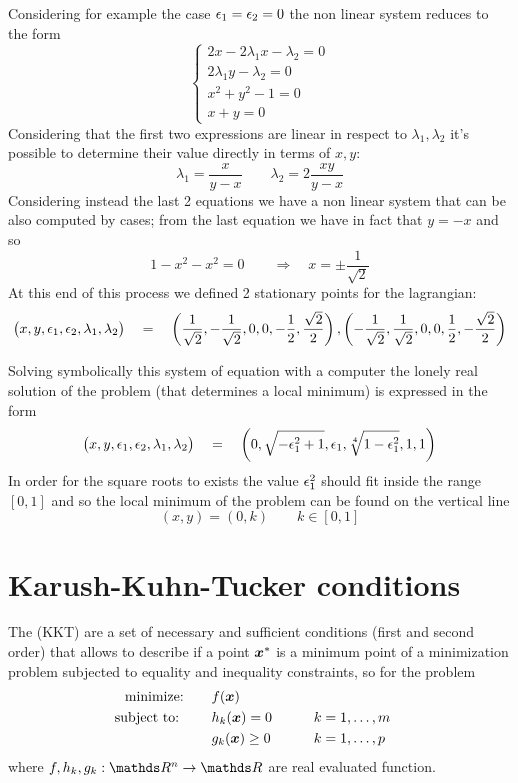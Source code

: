 \begin{example}{}
		Considering for example the case $\epsilon_{1} = \epsilon_{2} = 0$ the non linear system reduces to the form
		\[\begin{cases}
			2x - 2\lambda_1 x - \lambda_2 = 0 \\ 
			2\lambda_1 y - \lambda_2 = 0 \\
			x^2+y^2-1 = 0 \\ 
			x + y = 0 
		\end{cases}\]
		Considering that the first two expressions are linear in respect to $\lambda_1,\lambda_2$ it's possible to determine their value directly in terms of $x,y$:
		\[ \lambda_1 = \frac{x}{y-x} \qquad \lambda_2 = 2 \frac{xy}{y-x} \]
		Considering instead the last 2 equations we have a non linear system that can be also computed by cases; from the last equation we have in fact that $y = -x$ and so
		\[ 1-x^2-x^2 = 0 \qquad \Rightarrow \quad x = \pm \frac{1}{\sqrt 2} \]
		At this end of this process we defined 2 stationary points for the lagrangian:
		\[ \big(x,y,\epsilon_{1},\epsilon_{2},\lambda_1,\lambda_2\big) \quad = \quad \left( \frac 1 {\sqrt 2} , - \frac{1}{\sqrt 2},0,0,-\frac 1 2, \frac{\sqrt 2}{2} \right) , \left( - \frac 1 {\sqrt 2} , \frac{1}{\sqrt 2},0,0,\frac 1 2, -\frac{\sqrt 2}{2} \right) \]
		
		Solving symbolically this system of equation with a computer the lonely real solution of the problem (that determines a local minimum) is expressed in the form
		\[ \big(x,y,\epsilon_{1},\epsilon_{2},\lambda_1,\lambda_2\big) \quad = \quad \left( 0, \sqrt{-\epsilon_{1}^2 + 1 }, \epsilon_{1} ,\sqrt[4]{1 - \epsilon_{1}^2}, 1, 1 \right) \]
		In order for the square roots to exists the value $\epsilon_{1}^2$ should fit inside the range $[0,1]$ and so the local minimum of the problem can be found on the vertical line
		\[ (x,y) = (0,k) \qquad k \in [0,1] \]
		
		
	\end{example}
	
	
	
\section{Karush-Kuhn-Tucker conditions}
	The \de{\kkt} (KKT)  are a set of necessary and sufficient conditions (first and second order) that allows to describe if a point $\boldsymbol{x}^*$ is a minimum point of a minimization problem subjected to equality and inequality constraints, so for the problem
	\begin{align*}
		\textrm{minimize:} \qquad & f(\boldsymbol{x}) \\
		\textrm{subject to:}\qquad  \ & h_k(\boldsymbol{x}) = 0 \qquad && k=1,\dots, m\\
		& g_k(\boldsymbol{x}) \geq 0  &&k = 1,\dots,p
	\end{align*}
	where $f,h_k,g_k: \R^n\rightarrow \R$ are real evaluated function.
	
